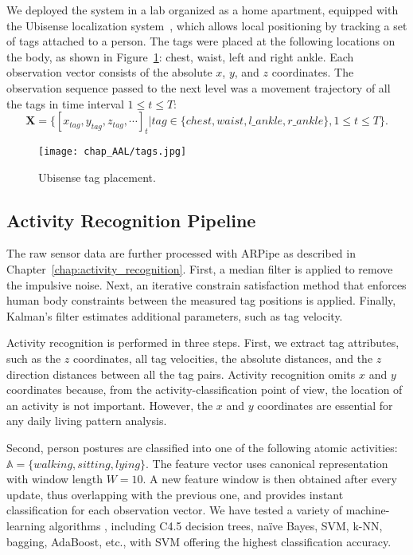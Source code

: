 We deployed the system in a lab organized as a home apartment, equipped with the Ubisense localization system~\citep{Ubisense}, which allows local positioning by tracking a set of tags attached to a person. The tags were placed at the following locations on the body, as shown in Figure~\ref{fig:tags}: chest, waist, left and right ankle. Each observation vector consists of the absolute $x$, $y$, and $z$ coordinates. 
The observation sequence passed to the next level was a movement trajectory of all the tags in time interval $1 \leq t \leq T$:
$$\mathbf{X}=\{[x_{tag}, y_{tag}, z_{tag}, \cdots]_t | tag \in \{chest, waist, l\_ankle, r\_ankle\}, 1 \leq t \leq T\}.$$

\begin{figure}[!ht]
\centering
\texttt{[image: chap\_AAL/tags.jpg]}
\caption{Ubisense tag placement.}
\label{fig:tags}
\end{figure}



\subsection{Activity Recognition Pipeline}
\label{sec:overview:ar}

The raw sensor data are further processed with ARPipe as described in Chapter~\ref{chap:activity_recognition}. First, a median filter is applied to remove the impulsive noise. Next, an iterative constrain satisfaction method that enforces human body constraints between the measured tag positions is applied. Finally, Kalman's filter estimates additional parameters, such as tag velocity.

Activity recognition is performed in three steps. First, we extract tag attributes, such as the $z$ coordinates, all tag velocities, the absolute distances, and the $z$ direction distances between all the tag pairs. Activity recognition omits $x$ and $y$ coordinates because, from the activity-classification point of view, the location of an activity is not important. However, the $x$ and $y$ coordinates are essential for any daily living pattern analysis.

Second, person postures are classified into one of the following atomic activities: $\mathbb{A}=\{walking, sitting, lying\}$. The feature vector uses canonical representation with window length $W=10$. A new feature window is then obtained after every update, thus overlapping with the previous one, and provides instant classification for each observation vector. We have tested a variety of machine-learning algorithms \citep{Lustrek2009Fall}, including C4.5 decision trees, na{\"i}ve Bayes, SVM, k-NN, bagging, AdaBoost, etc., with SVM offering the highest classification accuracy.

